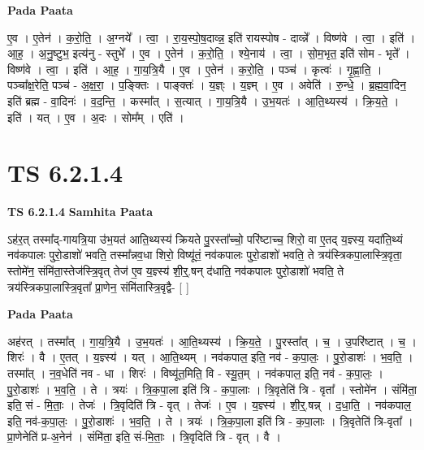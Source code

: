 \documentclass[17pt]{extarticle}
\begin{document}
\textbf{Pada Paata} \newline

ए॒व । ए॒तेन॑ । क॒रो॒ति॒ । अ॒ग्नये᳚ । त्वा॒ । रा॒य॒स्पो॒ष॒दाव्न्न॒ इति॑ रायस्पोष - दाव्न्ने᳚ । विष्ण॑वे । त्वा॒ । इति॑ । आ॒ह॒ । अ॒नु॒ष्टुभ॒ इत्य॑नु - स्तुभे᳚ । ए॒व । ए॒तेन॑ । क॒रो॒ति॒ । श्ये॒नाय॑ । त्वा॒ । सो॒म॒भृत॒ इति॑ सोम - भृते᳚ । विष्ण॑वे । त्वा॒ । इति॑ । आ॒ह॒ । गा॒य॒त्रि॒यै । ए॒व । ए॒तेन॑ । क॒रो॒ति॒ । पञ्च॑ । कृत्वः॑ । गृ॒ह्णा॒ति॒ । पञ्चा᳚क्ष॒रेति॒ पञ्च॑ - अ॒क्ष॒रा॒ । प॒ङ्क्तिः । पाङ्क्तः॑ । य॒ज्ञ्ः । य॒ज्ञ्म् । ए॒व । अवेति॑ । रु॒न्धे॒ । ब्र॒ह्म॒वा॒दिन॒ इति॑ ब्रह्म - वा॒दिनः॑ । व॒द॒न्ति॒ । कस्मा᳚त् । स॒त्यात् । गा॒य॒त्रि॒यै । उ॒भ॒यतः॑ । आ॒ति॒थ्यस्य॑ । क्रि॒य॒ते॒ । इति॑ । यत् । ए॒व । अ॒दः । सोम᳚म् । एति॑ ।  \newline




\section*{ TS 6.2.1.4 }

\textbf{TS 6.2.1.4 } \newline
\textbf{Samhita Paata} \newline

ऽह॑र॒त् तस्मा᳚द्-गायत्रि॒या उ॑भ॒यत॑ आति॒थ्यस्य॑ क्रियते पु॒रस्ता᳚च्चो॒ परि॑ष्टाच्च॒ शिरो॒ वा ए॒तद् य॒ज्ञ्स्य॒ यदा॑ति॒थ्यं नव॑कपालः पुरो॒डाशो॑ भवति॒ तस्मा᳚न्नव॒धा शिरो॒ विष्यू॑तं॒ नव॑कपालः पुरो॒डाशो॑ भवति॒ ते त्रय॑स्त्रिकपा॒लास्त्रि॒वृता॒ स्तोमे॑न॒ संमि॑ता॒स्तेज॑स्त्रि॒वृत् तेज॑ ए॒व य॒ज्ञ्स्य॑ शी॒र्॒.षन् द॑धाति॒ नव॑कपालः पुरो॒डाशो॑ भवति॒ ते त्रय॑स्त्रिकपा॒लास्त्रि॒वृता᳚ प्रा॒णेन॒ संमि॑तास्त्रि॒वृद्वै- [  ] \newline

\textbf{Pada Paata} \newline

अह॑रत् । तस्मा᳚त् । गा॒य॒त्रि॒यै । उ॒भ॒यतः॑ । आ॒ति॒थ्यस्य॑ । क्रि॒य॒ते॒ । पु॒रस्ता᳚त् । च॒ । उ॒परि॑ष्टात् । च॒ । शिरः॑ । वै । ए॒तत् । य॒ज्ञ्स्य॑ । यत् । आ॒ति॒थ्यम् । नव॑कपाल॒ इति॒ नव॑ - क॒पा॒लः॒ । पु॒रो॒डाशः॑ । भ॒व॒ति॒ । तस्मा᳚त् । न॒व॒धेति॑ नव - धा । शिरः॑ । विष्यू॑त॒मिति॒ वि - स्यू॒त॒म् । नव॑कपाल॒ इति॒ नव॑ - क॒पा॒लः॒ । पु॒रो॒डाशः॑ । भ॒व॒ति॒ । ते । त्रयः॑ । त्रि॒क॒पा॒ला इति॑ त्रि - क॒पा॒लाः । त्रि॒वृतेति॑ त्रि - वृता᳚ । स्तोमे॑न । संमि॑ता॒ इति॒ सं - मि॒ताः॒ । तेजः॑ । त्रि॒वृदिति॑ त्रि - वृत् । तेजः॑ । ए॒व । य॒ज्ञ्स्य॑ । शी॒र्॒.षन्न् । द॒धा॒ति॒ । नव॑कपाल॒ इति॒ नव॑-क॒पा॒लः॒ । पु॒रो॒डाशः॑ । भ॒व॒ति॒ । ते । त्रयः॑ । त्रि॒क॒पा॒ला इति॑ त्रि - क॒पा॒लाः । त्रि॒वृतेति॑ त्रि-वृता᳚ । प्रा॒णेनेति॑ प्र-अ॒नेन॑ । संमि॑ता॒ इति॒ सं-मि॒ताः॒ । त्रि॒वृदिति॑ त्रि - वृत् । वै ।  \newline
\end{document}
